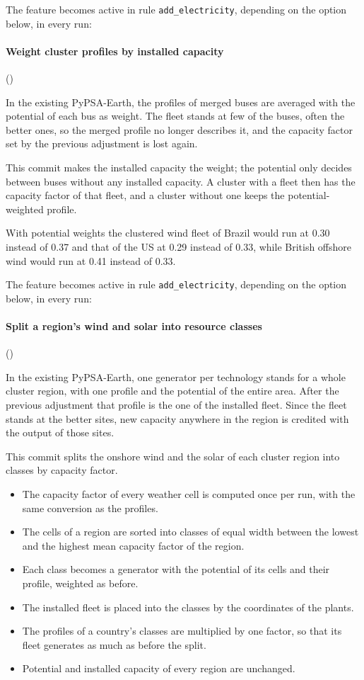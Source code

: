The feature becomes active in rule \texttt{add\_electricity}, depending on the option below, in every run:

\paragraph{Weight cluster profiles by installed capacity} ()

In the existing PyPSA-Earth, the profiles of merged buses are averaged with the potential of each bus as weight.
The fleet stands at few of the buses, often the better ones, so the merged profile no longer describes it, and the capacity factor set by the previous adjustment is lost again.

This commit makes the installed capacity the weight; the potential only decides between buses without any installed capacity.
A cluster with a fleet then has the capacity factor of that fleet, and a cluster without one keeps the potential-weighted profile.

With potential weights the clustered wind fleet of Brazil would run at 0.30 instead of 0.37 and that of the US at 0.29 instead of 0.33, while British offshore wind would run at 0.41 instead of 0.33.

The feature becomes active in rule \texttt{add\_electricity}, depending on the option below, in every run:

\paragraph{Split a region's wind and solar into resource classes} ()

In the existing PyPSA-Earth, one generator per technology stands for a whole cluster region, with one profile and the potential of the entire area.
After the previous adjustment that profile is the one of the installed fleet.
Since the fleet stands at the better sites, new capacity anywhere in the region is credited with the output of those sites.

This commit splits the onshore wind and the solar of each cluster region into classes by capacity factor.
\begin{itemize}[nosep,leftmargin=*]
  \item The capacity factor of every weather cell is computed once per run, with the same conversion as the profiles.
  \item The cells of a region are sorted into classes of equal width between the lowest and the highest mean capacity factor of the region.
  \item Each class becomes a generator with the potential of its cells and their profile, weighted as before.
  \item The installed fleet is placed into the classes by the coordinates of the plants.
  \item The profiles of a country's classes are multiplied by one factor, so that its fleet generates as much as before the split.
  \item Potential and installed capacity of every region are unchanged.
\end{itemize}

